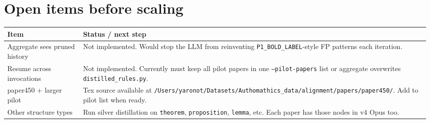 \documentclass[10pt]{article}
\begin{document}
\section*{Open items before scaling}

\noindent
\begin{tabular}{p{4.2cm}p{12.0cm}}
\toprule
\textbf{Item} & \textbf{Status / next step} \\
\midrule
Aggregate sees pruned history & Not implemented. Would stop the LLM from reinventing \texttt{P1\_BOLD\_LABEL}-style FP patterns each iteration. \\
Resume across invocations & Not implemented. Currently must keep all pilot papers in one \texttt{--pilot-papers} list or aggregate overwrites \texttt{distilled\_rules.py}. \\
paper450 + larger pilot & Tex source available at \texttt{/Users/yaronot/Datasets/Authomathics\_data/alignment/papers/paper450/}. Add to pilot list when ready. \\
Other structure types & Run silver distillation on \texttt{theorem}, \texttt{proposition}, \texttt{lemma}, etc. Each paper has those nodes in v4 Opus too. \\
\bottomrule
\end{tabular}
\end{document}
